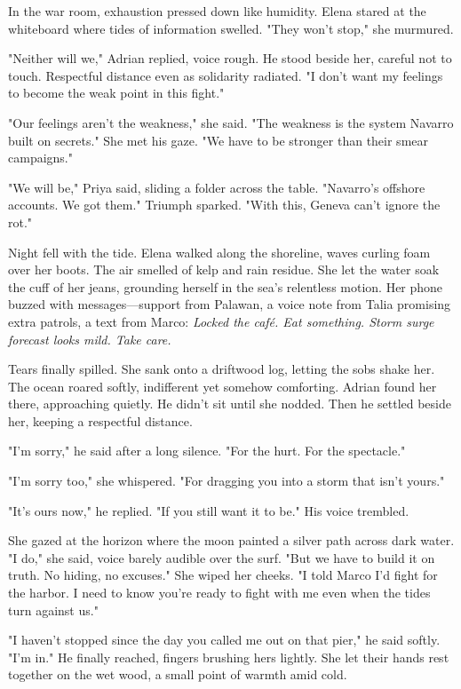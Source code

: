 In the war room, exhaustion pressed down like humidity. Elena stared at the whiteboard where tides of information swelled. "They won't stop," she murmured.

"Neither will we," Adrian replied, voice rough. He stood beside her, careful not to touch. Respectful distance even as solidarity radiated. "I don't want my feelings to become the weak point in this fight."

"Our feelings aren't the weakness," she said. "The weakness is the system Navarro built on secrets." She met his gaze. "We have to be stronger than their smear campaigns."

"We will be," Priya said, sliding a folder across the table. "Navarro's offshore accounts. We got them." Triumph sparked. "With this, Geneva can't ignore the rot."

Night fell with the tide. Elena walked along the shoreline, waves curling foam over her boots. The air smelled of kelp and rain residue. She let the water soak the cuff of her jeans, grounding herself in the sea's relentless motion. Her phone buzzed with messages—support from Palawan, a voice note from Talia promising extra patrols, a text from Marco: \textit{Locked the café. Eat something. Storm surge forecast looks mild. Take care.}

Tears finally spilled. She sank onto a driftwood log, letting the sobs shake her. The ocean roared softly, indifferent yet somehow comforting. Adrian found her there, approaching quietly. He didn't sit until she nodded. Then he settled beside her, keeping a respectful distance.

"I'm sorry," he said after a long silence. "For the hurt. For the spectacle."

"I'm sorry too," she whispered. "For dragging you into a storm that isn't yours."

"It's ours now," he replied. "If you still want it to be." His voice trembled.

She gazed at the horizon where the moon painted a silver path across dark water. "I do," she said, voice barely audible over the surf. "But we have to build it on truth. No hiding, no excuses." She wiped her cheeks. "I told Marco I'd fight for the harbor. I need to know you're ready to fight with me even when the tides turn against us."

"I haven't stopped since the day you called me out on that pier," he said softly. "I'm in." He finally reached, fingers brushing hers lightly. She let their hands rest together on the wet wood, a small point of warmth amid cold.

